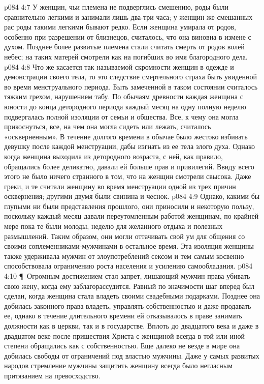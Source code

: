 \vs p084 4:7 У женщин, чьи племена не подверглись смешению, роды были сравнительно легкими и занимали лишь два\hyp{}три часа; у женщин же смешанных рас роды такими легкими бывают редко. Если женщина умирала от родов, особенно при разрешении от близнецов, считалось, что она виновна в измене с духом. Позднее более развитые племена стали считать смерть от родов волей небес; на таких матерей смотрели как на погибших во имя благородного дела.
\vs p084 4:8 Что же касается так называемой скромности женщин в одежде и демонстрации своего тела, то это следствие смертельного страха быть увиденной во время менструального периода. Быть замеченной в таком состоянии считалось тяжким грехом, нарушением табу. По обычаям древности каждая женщина с юности до конца детородного периода каждый месяц на одну полную неделю подвергалась полной изоляции от семьи и общества. Все, к чему она могла прикоснуться, все, на чем она могла сидеть или лежать, считалось «оскверненным». В течение долгого времени в обычае было жестоко избивать девушку после каждой менструации, дабы изгнать из ее тела злого духа. Однако когда женщина выходила из детородного возраста, с ней, как правило, обращались более деликатно, давали ей больше прав и привилегий. Ввиду всего этого не было ничего странного в том, что на женщин смотрели свысока. Даже греки, и те считали женщину во время менструации одной из трех причин осквернения; другими двумя были свинина и чеснок.
\vs p084 4:9 Однако, какими бы глупыми ни были представления прошлого, они приносили и некоторую пользу, поскольку каждый месяц давали переутомленным работой женщинам, по крайней мере пока те были молоды, неделю для желанного отдыха и полезных размышлений. Таким образом, они могли оттачивать свой ум для общения со своими соплеменниками\hyp{}мужчинами в остальное время. Эта изоляция женщины также удерживала мужчин от злоупотреблений сексом и тем самым косвенно способствовала ограничению роста населения и усилению самообладания.
\vs p084 4:10 \P\ Огромным достижением стал запрет, лишающий мужчин права убивать свою жену, когда ему заблагорассудится. Равный по значимости шаг вперед был сделан, когда женщина стала владеть своими свадебными подарками. Позднее она добилась законного права владеть, управлять собственностью и даже продавать ее, однако в течение длительного времени ей отказывалось в праве занимать должности как в церкви, так и в государстве. Вплоть до двадцатого века и даже в двадцатом веке после пришествия Христа с женщиной всегда в той или иной степени обращались как с собственностью. Еще далеко не везде в мире она добилась свободы от ограничений под властью мужчины. Даже у самых развитых народов стремление мужчины защитить женщину всегда было негласным притязанием на превосходство.
